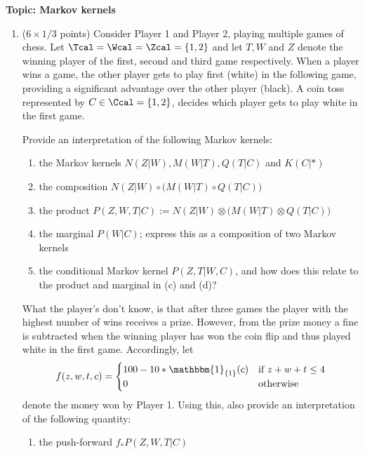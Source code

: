

\flushleft\textbf{Topic: Markov kernels}

\begin{enumerate}
\item ($6 \times 1/3$ points) Consider Player 1 and Player 2, playing multiple games of chess.
Let $\Tcal = \Wcal = \Zcal = \{1,2\}$ and let $T, W$ and $Z$ denote the winning player of the first, second and third game respectively. When a player wins a game, the other player gets to play first (white) in the following game, providing a significant advantage over the other player (black). A coin toss represented by $C \in \Ccal = \{1,2\}$, decides which player gets to play white in the first game.

Provide an interpretation of the following Markov kernels: %
\begin{enumerate}
  \item the Markov kernels $N(Z|W), M(W|T), Q(T|C)$ and $K(C|*)$
  \item the composition $N(Z|W) \circ \big(M(W|T)\circ Q(T|C)\big)$
  \item the product $P(Z, W, T|C) := N(Z|W) \otimes \big(M(W|T)\otimes Q(T|C)\big)$
  \item the marginal $P(W|C)$; express this as a composition of two Markov kernels
  \item the conditional Markov kernel $P(Z,T|W,C)$, and how does this relate to the product and marginal in (c) and (d)?
\end{enumerate}
What the player's don't know, is that after three games the player with the highest number of wins receives a prize. However, from the prize money a fine is subtracted when the winning player has won the coin flip and thus played white in the first game. Accordingly, let
$$f(z,w,t, c) = \begin{cases} 100 - 10*\mathbbm{1}_{\{1\}}(c) & \text{if $z+w+t \leq 4$} \\ 0 &\text{otherwise}\end{cases}$$
denote the money won by Player 1. Using this, also provide an interpretation of the following quantity:
\begin{enumerate}
  \item[(f)] the push-forward $f_*P(Z, W, T|C)$
\end{enumerate}


\end{enumerate}
